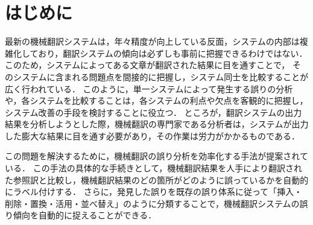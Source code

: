 \documentclass[japanese]{jnlp_1.4}
\newcommand{\textcolor}[2]{}
\begin{document}
\maketitle


\section{はじめに}

最新の機械翻訳システムは，年々精度が向上している反面，システムの内部は複雑化しており，翻訳システムの傾向は必ずしも事前に把握できるわけではない．
このため，システムによってある文章が翻訳された結果に目を通すことで，
そのシステムに含まれる問題点を間接的に把握し，システム同士を比較することが広く行われている．
このように，単一システムによって発生する誤りの分析や，各システムを比較することは，各システムの利点や欠点を客観的に把握し，システム改善の手段を検討することに役立つ．
ところが，翻訳システムの出力結果を分析しようとした際，機械翻訳の専門家である分析者は，システムが出力した膨大な結果に目を通す必要があり，その作業は労力がかかるものである．


この問題を解決するために，機械翻訳の誤り分析を効率化する手法が提案されている\cite{popovic2011towards,kirchhoff2007semi,fishel2011automatic,elkholy11morphologicallyrich}．
この手法の具体的な手続きとして，機械翻訳結果を人手により翻訳された参照訳と比較し，機械翻訳結果のどの箇所がどのように誤っているかを自動的にラベル付けする．
さらに，発見した誤りを既存の誤り体系\cite{flanagan1994error,vilar2006error}に従って「挿入・削除・置換・活用・並べ替え」のように分類することで，機械翻訳システムの誤り傾向を自動的に捉えることができる．

\textcolor{black}{しかし，このような自動分析で誤りのおおよその傾向をつかめたとしても，機械翻訳システムを改善する上で，詳細な翻訳誤り現象を把握するためには，人手による誤り分析が欠かせない．}
\textcolor{black}{ところが，先行研究と同じように，参照文と機械翻訳結果を比較して差分に基づいて誤りを集計する手法で詳細な誤り分析を行おうとした際に，問題が発生する．
具体的には，機械翻訳結果と参照訳の文字列の不一致箇所を単純な方法でラベル付けすると，人間の評価と一致しなくなる場合がある．
つまり，機械翻訳結果が参照訳と同様の意味でありながら表層的な文字列が異なる換言の場合，先行研究では不一致箇所を誤り箇所として捉えてしまう．
このような誤った判断は，誤り分析を効率化する上で支障となる．}
\end{document}
